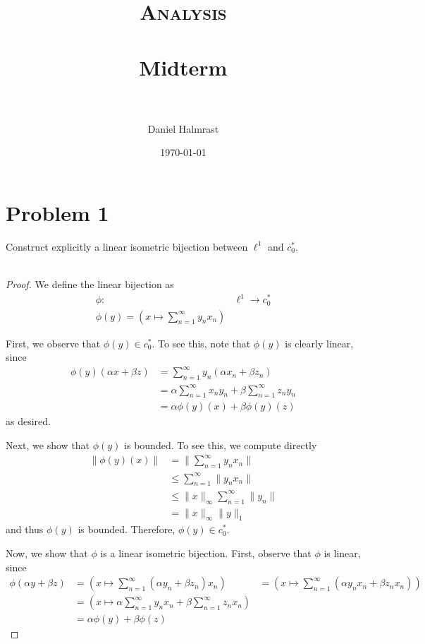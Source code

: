 \documentclass[fontsize=11pt]{scrartcl} %
\title{	
\normalfont \normalsize 
\textsc{Analysis} \\ [25pt] %
\horrule{0.5pt} \\[0.4cm] %
\huge Midterm \\ %
\horrule{2pt} \\[0.5cm] %
}
\author{Daniel Halmrast} %
\date{\normalsize\today} %
\numberwithin{equation}{section} %
\numberwithin{figure}{section} %
\numberwithin{table}{section} %
\begin{document}
\maketitle %

\section*{Problem 1}
Construct explicitly a linear isometric bijection between $\ell^1$ and $c_0^*$.
\\
\\
\begin{proof}
    We define the linear bijection as
    \[
        \begin{aligned}
        \phi:&\ell^1\to c_0^*\\
        \phi(y) = (x\mapsto \sum_{n=1}^{\infty} y_nx_n)
    \end{aligned}
    \]

    First, we observe that $\phi(y)\in c_0^*$. To see this, note that $\phi(y)$
    is clearly linear, since 
    \[
\begin{aligned}
    \phi(y)(\alpha x+\beta z) &= \sum_{n=1}^{\infty}y_n(\alpha x_n+\beta z_n)\\
    &=\alpha\sum_{n=1}^{\infty}x_ny_n + \beta\sum_{n=1}^{\infty}z_ny_n\\
    &=\alpha\phi(y)(x) + \beta\phi(y)(z)
\end{aligned}
    \]
    as desired.

    Next, we show that $\phi(y)$ is bounded. To see this, we compute directly
    \[
\begin{aligned}
    \|\phi(y)(x)\| &= \|\sum_{n=1}^{\infty}y_nx_n\|\\
    &\leq \sum_{n=1}^{\infty}\|y_nx_n\|\\
    &\leq \|x\|_{\infty}\sum_{n=1}^{\infty}\|y_n\|\\
    &= \|x\|_{\infty}\|y\|_1
\end{aligned}
    \]
    and thus $\phi(y)$ is bounded. Therefore, $\phi(y)\in c_0^*$.

    Now, we show that $\phi$ is a linear isometric bijection. First, observe
    that $\phi$ is linear, since
    \[
\begin{aligned}
    \phi(\alpha y + \beta z) &= 
    \left(x\mapsto \sum_{n=1}^{\infty}(\alpha y_n+\beta z_n)x_n\right)
    &= \left(x\mapsto \sum_{n=1}^{\infty}(\alpha y_nx_n + \beta z_nx_n)\right)\\
    &=\left( x\mapsto \alpha\sum_{n=1}^{\infty}y_nx_n +
    \beta\sum_{n=1}^{\infty}z_nx_n \right)\\
    &= \alpha\phi(y) + \beta\phi(z)
\end{aligned}
    \]


\end{proof}
\end{document}
